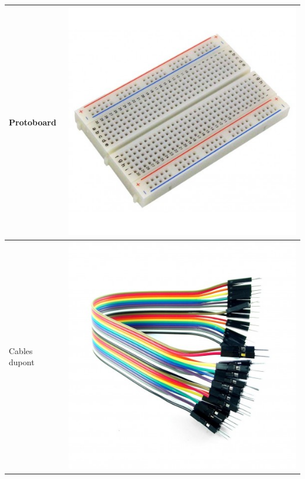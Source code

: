 \documentclass[11pt,twocolumn,letterpaper,spanish]{article}
\begin{document}
\begin{table}[hbt!]
\begin{tabular}{ m{6cm}  m{3.5cm} }
      Protoboard & \includegraphics[align=t,scale=0.15]{Materiales/proto}\\
      \hline
      Cables dupont & \includegraphics[align=t,scale=0.14]{Materiales/dupont}\\
      \hline

\end{tabular}
\end{table}
\end{document}
